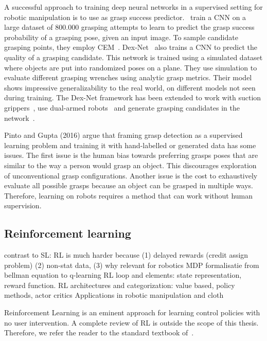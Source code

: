 \documentclass[\home/main.tex]{subfiles}
\begin{document}
A successful approach to training deep neural networks in a supervised setting for robotic manipulation is to use  as grasp success predictor.~\textcite{Levine2016} train a \acrshort{CNN} on a large dataset of $800.000$ grasping attempts to learn to predict the grasp success probability of a grasping pose, given an input image. To sample candidate grasping points, they employ CEM~\autocite{CEM}. Dex-Net~\autocite{dexnet2} also trains a \acrshort{CNN} to predict the quality of a grasping candidate. This network is trained using a simulated dataset where objects are put into randomized poses on a plane. They use simulation to evaluate different grasping wrenches using analytic grasp metrics. Their model shows impressive generalizability to the real world, on different models not seen during training. The Dex-Net framework has been extended to work with suction grippers~\autocite{dexnet3}, use dual-armed robots~\autocite{dexnet4} and generate grasping candidates in the network~\autocite{Satish2019}.



Pinto and Gupta (2016) argue that framing grasp detection as a supervised learning problem and training it with hand-labelled or generated data has some issues. The first issue is the human bias towards preferring grasps poses that are similar to the way a person would grasp an object. This discourages exploration of unconventional grasp configurations. Another issue is the cost to exhaustively evaluate all possible grasps because an object can be grasped in multiple ways. Therefore, learning on robots requires a method that can work without human supervision.

\subsection{Reinforcement learning} \label{subsec:lit_rl}
contrast to SL: RL is much harder because (1) delayed rewards (credit assign problem) (2) non-stat data, (3) 
why relevant for robotics
MDP formalisatie
from bellman equation to q-learning 
RL loop and elements: state representation, reward function. 
RL architectures and categorization: value based, policy methods, actor critics 
Applications in robotic manipulation and cloth 

Reinforcement Learning is an eminent approach for learning control policies with no user intervention. A complete review of RL is outside the scope of this thesis. Therefore, we refer the reader to the standard textbook of~\textcite{Sutton2018}.
\end{document}
